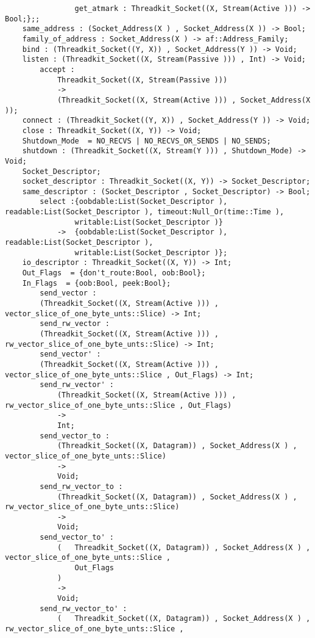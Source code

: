 \begin{verbatim}
                get_atmark : Threadkit_Socket((X, Stream(Active ))) -> Bool;};;
    same_address : (Socket_Address(X ) , Socket_Address(X )) -> Bool;
    family_of_address : Socket_Address(X ) -> af::Address_Family;
    bind : (Threadkit_Socket((Y, X)) , Socket_Address(Y )) -> Void;
    listen : (Threadkit_Socket((X, Stream(Passive ))) , Int) -> Void;
        accept :
            Threadkit_Socket((X, Stream(Passive )))
            ->
            (Threadkit_Socket((X, Stream(Active ))) , Socket_Address(X ));
    connect : (Threadkit_Socket((Y, X)) , Socket_Address(Y )) -> Void;
    close : Threadkit_Socket((X, Y)) -> Void;
    Shutdown_Mode  = NO_RECVS | NO_RECVS_OR_SENDS | NO_SENDS;
    shutdown : (Threadkit_Socket((X, Stream(Y ))) , Shutdown_Mode) -> Void;
    Socket_Descriptor;
    socket_descriptor : Threadkit_Socket((X, Y)) -> Socket_Descriptor;
    same_descriptor : (Socket_Descriptor , Socket_Descriptor) -> Bool;
        select :{oobdable:List(Socket_Descriptor ), readable:List(Socket_Descriptor ), timeout:Null_Or(time::Time ),
                writable:List(Socket_Descriptor )}
            ->  {oobdable:List(Socket_Descriptor ), readable:List(Socket_Descriptor ),
                writable:List(Socket_Descriptor )};
    io_descriptor : Threadkit_Socket((X, Y)) -> Int;
    Out_Flags  = {don't_route:Bool, oob:Bool};
    In_Flags  = {oob:Bool, peek:Bool};
        send_vector :
        (Threadkit_Socket((X, Stream(Active ))) , vector_slice_of_one_byte_unts::Slice) -> Int;
        send_rw_vector :
        (Threadkit_Socket((X, Stream(Active ))) , rw_vector_slice_of_one_byte_unts::Slice) -> Int;
        send_vector' :
        (Threadkit_Socket((X, Stream(Active ))) , vector_slice_of_one_byte_unts::Slice , Out_Flags) -> Int;
        send_rw_vector' :
            (Threadkit_Socket((X, Stream(Active ))) , rw_vector_slice_of_one_byte_unts::Slice , Out_Flags)
            ->
            Int;
        send_vector_to :
            (Threadkit_Socket((X, Datagram)) , Socket_Address(X ) , vector_slice_of_one_byte_unts::Slice)
            ->
            Void;
        send_rw_vector_to :
            (Threadkit_Socket((X, Datagram)) , Socket_Address(X ) , rw_vector_slice_of_one_byte_unts::Slice)
            ->
            Void;
        send_vector_to' :
            (   Threadkit_Socket((X, Datagram)) , Socket_Address(X ) , vector_slice_of_one_byte_unts::Slice ,
                Out_Flags
            )
            ->
            Void;
        send_rw_vector_to' :
            (   Threadkit_Socket((X, Datagram)) , Socket_Address(X ) , rw_vector_slice_of_one_byte_unts::Slice ,

\end{verbatim}
